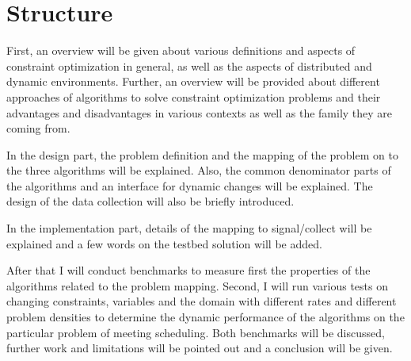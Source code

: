 
\section{Structure}
First, an overview will be given about various definitions and aspects of constraint optimization in general, as well as the aspects of  distributed and dynamic environments. Further, an overview will be provided about different approaches of algorithms to solve constraint optimization problems and their advantages and disadvantages in various contexts as well as the family they are coming from. 

In the design part, the problem definition and the mapping of the problem on to the three algorithms will be explained. Also, the common denominator parts of the algorithms and an interface for dynamic changes will be explained. The design of the data collection will also be briefly introduced.

In the implementation part, details of the mapping to signal/collect will be explained and a few words on the testbed solution will be added.

After that I will conduct benchmarks to measure first the properties of the algorithms related to the problem mapping. Second, I will run various tests on changing constraints, variables and the domain with different rates and different problem densities to determine the dynamic performance of the algorithms on the particular problem of meeting scheduling. Both benchmarks will be discussed, further work and limitations will be pointed out and a conclusion will be given.